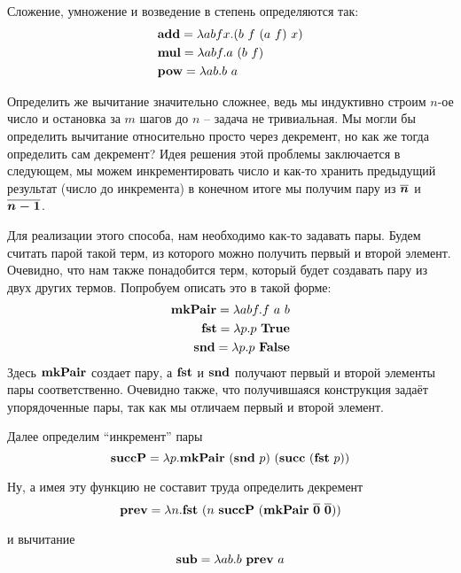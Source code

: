 \documentclass[lambda.tex]{subfiles}
\begin{document}
Сложение, умножение и возведение в степень определяются так:
\begin{align*}
	&\text{\textbf{add}} = \lambda abfx.(b\ f\ (a\ f)\ x)\\
	&\text{\textbf{mul}} = \lambda abf.a\ (b\ f)\\
	&\text{\textbf{pow}} = \lambda ab.b\ a
\end{align*}

Определить же вычитание значительно сложнее, ведь мы индуктивно строим $n$-ое число и остановка за $m$ шагов до $n$ -- задача не тривиальная. Мы могли бы определить вычитание относительно просто через декремент, но как же тогда определить сам декремент?
Идея решения этой проблемы заключается в следующем, мы можем инкрементировать число и как-то хранить предыдущий результат (число до инкремента) в конечном итоге мы получим пару из $\boldsymbol{\overline{n}}$ и $\boldsymbol{\overline{n-1}}$.

Для реализации этого способа, нам необходимо как-то задавать пары. Будем считать парой такой терм, из которого можно получить первый и второй элемент. Очевидно, что нам также понадобится терм, который будет создавать пару из двух других термов. Попробуем описать это в такой форме:
\begin{align*}
	\text{\textbf{mkPair}} = \lambda abf.f\ a\ b\\
	\text{\textbf{fst}} = \lambda p.p\ \text{\textbf{True}}\\
	\text{\textbf{snd}} = \lambda p.p\ \text{\textbf{False}}
\end{align*}
Здесь $\text{\textbf{mkPair}}$ создает пару, а $\text{\textbf{fst}}$ и $\text{\textbf{snd}}$ получают первый и второй элементы пары соответственно. Очевидно также, что получившаяся конструкция задаёт упорядоченные пары, так как мы отличаем первый и второй элемент.

Далее определим ``инкремент'' пары
\[\mmterm{succP} = \lambda p. \mmterm{mkPair}\ (\mmterm{snd}\ p)\ (\mmterm{succ}\ (\mmterm{fst}\ p))\]

Ну, а имея эту функцию не составит труда определить декремент
\[\mmterm{prev} = \lambda n.\mmterm{fst}\ (n\ \mmterm{succP}\ (\mmterm{mkPair}\ \mmchurchn{0}\ \mmchurchn{0}))\]

и вычитание
\[\mmterm{sub} = \lambda ab.b\ \mmterm{prev}\ a\]

\end{document}
